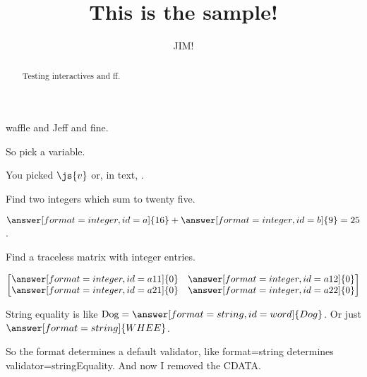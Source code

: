 \documentclass{ximera}
\title{This is the sample!}
\author{JIM!}
\begin{document}
\begin{abstract}
Testing interactives and ff.
\end{abstract}
\maketitle

waffle and Jeff and fine.



\begin{problem}
  So pick a variable.
  \begin{multipleChoice}[id=v]
  \end{multipleChoice}

  You picked $\js{v}$ or, in text, .


\end{problem}

\begin{problem}
  Find two integers which sum to twenty five.

  \begin{validator}[a+b==25]
    $\answer[format=integer,id=a]{16} + \answer[format=integer,id=b]{9} = 25$.
  \end{validator}

  Find a traceless matrix with integer entries.
  \begin{validator}[a11+a22==0]
    \[
      \begin{bmatrix}
        \answer[format=integer,id=a11]{0} &         \answer[format=integer,id=a12]{0} \\
        \answer[format=integer,id=a21]{0} &         \answer[format=integer,id=a22]{0} \\
      \end{bmatrix}
      \]
  \end{validator}


\end{problem}

\begin{problem}
  String equality is like $\mbox{Dog} = \answer[format=string,id=word]{Dog}$.  Or just $\answer[format=string]{WHEE}$.

  So the format determines a default validator, like format=string determines validator=stringEquality.  And now I removed the CDATA.
\end{problem}
\end{document}
